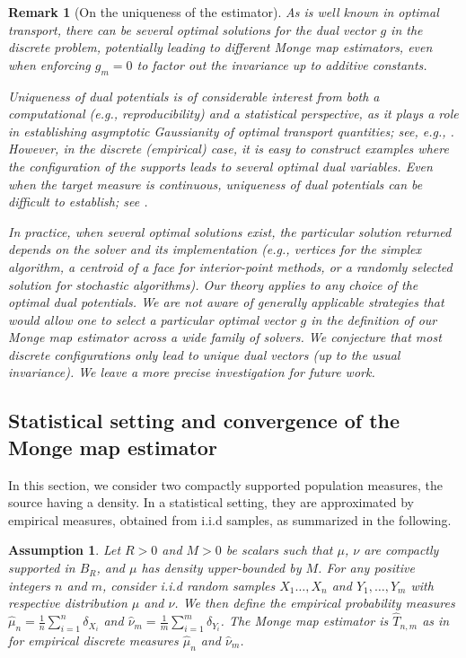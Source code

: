 \documentclass[11pt]{article}
\newtheorem{remark}[lemma]{Remark}
\newtheorem{assumption}{Assumption}
\newcommand{\1}{\mathbbm{1}}
\numberwithin{equation}{section}
\begin{document}
\begin{remark}[On the uniqueness of the estimator]

    As is well known in optimal transport, there can be several optimal solutions for the dual vector $g$ in the discrete problem, potentially leading to different Monge map estimators, even when enforcing $g_m=0$ to factor out the invariance up to additive constants.
    
    Uniqueness of dual potentials is of considerable interest from both a computational (e.g., reproducibility) and a statistical perspective, as it plays a role in establishing asymptotic Gaussianity of optimal transport quantities; see, \textit{e.g.}, \cite{del2024central}. However, in the discrete (empirical) case, it is easy to construct examples where the configuration of the supports leads to several optimal dual variables. Even when the target measure is continuous, uniqueness of dual potentials can be difficult to establish; see \cite{staudt2025uniqueness}. 
    
    In practice, when several optimal solutions exist, the particular solution returned depends on the solver and its implementation (e.g., vertices for the simplex algorithm, a centroid of a face for interior-point methods, or a randomly selected solution for stochastic algorithms). Our theory applies to any choice of the optimal dual potentials. We are not aware of generally applicable strategies that would allow one to select a particular optimal vector $g$ in the definition of our Monge map estimator across a wide family of solvers. We conjecture that most discrete configurations only lead to unique dual vectors (up to the usual invariance). We leave a more precise investigation for future work.
\end{remark}

\subsection{Statistical setting and convergence of the Monge map estimator}
\label{sec:mainStatisticalResult}


In this section, we consider two compactly supported population measures, the source having a density. In a statistical setting, they are approximated by empirical measures, obtained from i.i.d samples, as summarized in the following.
\begin{assumption}
    Let $R>0$ and $M>0$ be scalars such that $\mu$, $\nu$ are compactly supported in $B_R$, and $\mu$ has density upper-bounded by $M$. For any positive integers $n$ and $m$, consider i.i.d random samples $X_1\ldots,X_n$  and $Y_1,\ldots,Y_m$ with respective distribution $\mu$ and $\nu$. We then define the empirical probability measures $\hat{\mu}_n=\frac{1}{n}\sum_{i=1}^n\delta_{X_i}$ and $\hat{\nu}_m=\frac{1}{m}\sum_{i=1}^m\delta_{Y_i}$. The Monge map estimator is $\hat{T}_{n,m}$ as in  for empirical discrete measures $\hat{\mu}_n$ and $\hat{\nu}_m$.
    \label{Assumption_1}
\end{assumption}
\end{document}
